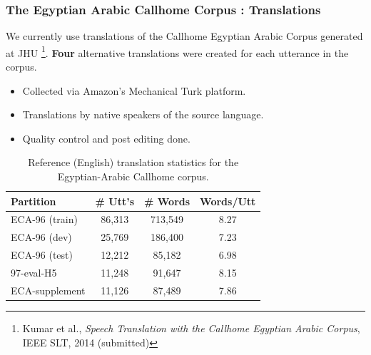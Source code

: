 \documentclass{beamer}
\begin{document}
\begin{frame}
\frametitle{The Egyptian Arabic Callhome Corpus : Translations}
We currently use translations of the Callhome Egyptian Arabic Corpus generated at JHU \footnote{\tiny{Kumar et al., \textit{Speech Translation with the Callhome Egyptian Arabic Corpus}, IEEE SLT, 2014 (submitted)}}. 
\textbf{Four} alternative translations were created for each utterance in the corpus.
\begin{itemize}
\item Collected via Amazon's Mechanical Turk platform.
\item Translations by native speakers of the source language.
\item Quality control and post editing done.
\end{itemize}

\begin{table}
\begin{center}
\begin{tabular}{| l | c | c | c |}
  \hline 
  \textbf{Partition} & \textbf{\# Utt's } & \textbf{\# Words} & \textbf{Words/Utt} \\ \hline
  ECA-96 (train) & 86,313 & 713,549 & 8.27\\
  \hline
  ECA-96 (dev) & 25,769 & 186,400 & 7.23\\
  \hline
  ECA-96 (test) & 12,212 & 85,182 & 6.98\\
  \hline
  97-eval-H5 & 11,248 & 91,647 & 8.15\\
  \hline
  ECA-supplement & 11,126 & 87,489 & 7.86\\
  \hline
\end{tabular}
\caption{Reference (English) translation statistics for the Egyptian-Arabic Callhome corpus.}
\label{tab:trans-results}
\end{center}
\end{table}

\end{frame}

\end{document}
